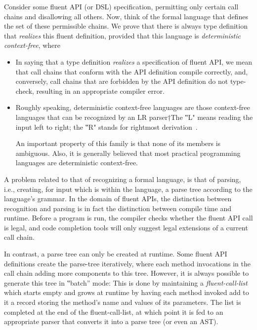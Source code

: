 Consider some fluent API (or DSL) specification, permitting only certain call
chains and disallowing all others.
Now, think of the formal language that defines the set of these permissible
chains.
We prove that there is always \Java type definition that
\emph{realizes} this fluent definition, provided that this
language is \emph{deterministic context-free}, where
\begin{itemize}
  \item In saying that a type definition \emph{realizes} a specification of
        fluent API, we mean that call chains that conform with the API definition
        compile correctly, and, conversely, call chains that are forbidden by the
        API definition do not type-check, resulting in an appropriate compiler
        error. \item Roughly speaking, deterministic context-free languages are
        those context-free languages that can be recognized by an LR parser†{The
          ‟L" means reading the input left to right; the ‟R" stands for rightmost
          derivation}~\cite{Aho:Sethi:Ullman:86}.
        \par
        An important property of this family is that none of its members is
        ambiguous. Also, it is generally believed that most practical programming
        languages are deterministic context-free.
\end{itemize}

A problem related to that of recognizing a formal language,
is that of parsing, i.e., creating, for input which is within the language,
a parse tree according to the language's grammar.
In the domain of fluent APIs, the distinction between recognition and parsing
is in fact the distinction between compile time and runtime.
Before a program is run, the compiler checks whether the fluent API call is
legal, and code completion tools will only suggest legal extensions of a
current call chain.

In contrast, a parse tree can only be created at runtime.
Some fluent API definitions create the parse-tree
iteratively, where each method invocations in the call chain adding
more components to this tree.
However, it is always possible to generate this tree in ‟batch” mode:
This is done by maintaining a \emph{fluent-call-list} which
starts empty and grows at runtime by having each method invoked add to it
a record storing the method's name and values of its parameters.
The list is completed at the end of the fluent-call-list, at which point it is
fed to an appropriate parser that converts it into a parse tree (or even an
AST).

